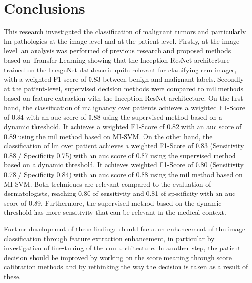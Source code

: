 \documentclass[journal,article,submit,moreauthors,pdftex, applsci]{Definitions/mdpi}
\begin{document}
\section{Conclusions}
\label{sec:conclusions}
This research investigated the classification of malignant tumors and particularly \ac{lm} pathologies at the image-level and at the patient-level. Firstly, at the image-level, an analysis was performed of previous research and proposed methods based on Transfer Learning showing that the Inception-ResNet architecture trained on the ImageNet database is quite relevant for classifying \ac{rcm} images, with a weighted F1 score of 0.83 between benign and malignant labels. Secondly at the patient-level, supervised decision methods were compared to \ac{mil} methods based on feature extraction with the Inception-ResNet architecture. On the first hand, the classification of malignancy over patients achieves a weighted F1-Score of 0.84 with an \ac{auc} score of 0.88 using the supervised method based on a dynamic threshold. It achieves a weighted F1-Score of 0.82 with an \ac{auc} score of 0.89 using the \ac{mil} method based on MI-SVM. On the other hand, the classification of \ac{lm} over patient achieves a weighted F1-Score of 0.83 (Sensitivity 0.88 / Specificity 0.75) with an \ac{auc} score of 0.87 using the supervised method based on a dynamic threshold. It achieves weighted F1-Score of 0.80 (Sensitivity 0.78 / Specificity 0.84) with an \ac{auc} score of 0.88 using the \ac{mil} method based on MI-SVM. Both techniques are relevant compared to the evaluation of dermatologists, reaching 0.80 of sensitivity and 0.81 of specificity with an \ac{auc} score of 0.89. Furthermore, the supervised method based on the dynamic threshold has more sensitivity that can be relevant in the medical context.\par
Further development of these findings should focus on enhancement of the image classification through feature extraction enhancement, in particular by investigation of fine-tuning of the \ac{cnn} architecture. In another step, the patient decision should be improved by working on the score meaning through score calibration methods and by rethinking the way the decision is taken as a result of these.\par

\vspace{10pt} 

\end{document}
